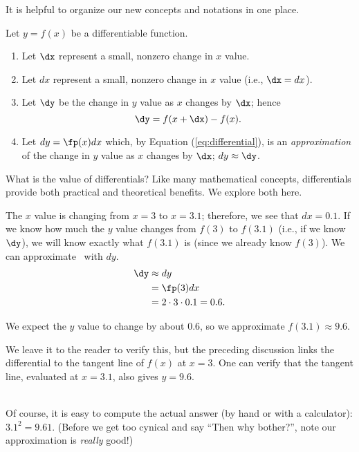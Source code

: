 It is helpful to organize our new concepts and notations in one place.

{Let $y = f(x)$ be a differentiable function. 
\begin{enumerate}
	\item Let $\dx$ represent a small, nonzero change in $x$ value.
	\item	Let $dx$ represent a small, nonzero change in $x$ value (i.e., $\dx = dx$).
	\item	Let $\dy$ be the change in $y$ value as $x$ changes by $\dx$; hence 
\[
\dy = f(x+\dx)-f(x).
\]
	\item		Let $dy = \fp(x)dx$ which, by Equation (\ref{eq:differential}), is an \textit{approximation} of the change in $y$ value as $x$ changes by $\dx$; $dy \approx \dy$.
\end{enumerate}
}

What is the value of differentials? Like many mathematical concepts, differentials provide both practical and theoretical benefits. We explore both here.\\

{The $x$ value is changing from $x=3$ to $x=3.1$; therefore, we see that $dx=0.1$. If we know how much the $y$ value changes from $f(3)$ to $f(3.1)$ (i.e., if we know $\dy$), we will know exactly what $f(3.1)$ is (since we already know $f(3)$). We can approximate \dy\ with $dy$.
\begin{align*} \dy &\approx dy \\
								  &= \fp(3)dx \\
								  &= 2\cdot 3\cdot 0.1 = 0.6.
\end{align*}

We expect the $y$ value to change by about $0.6$, so we approximate $f(3.1) \approx 9.6.$

We leave it to the reader to verify this, but the preceding discussion links the differential to the tangent line of $f(x)$ at $x=3$. One can verify that the tangent line, evaluated at $x=3.1$, also gives $y=9.6$.
}\\

Of course, it is easy to compute the actual answer (by hand or with a calculator): $3.1^2 = 9.61.$ (Before we get too cynical and say ``Then why bother?'', note our approximation is \textit{really} good!)

